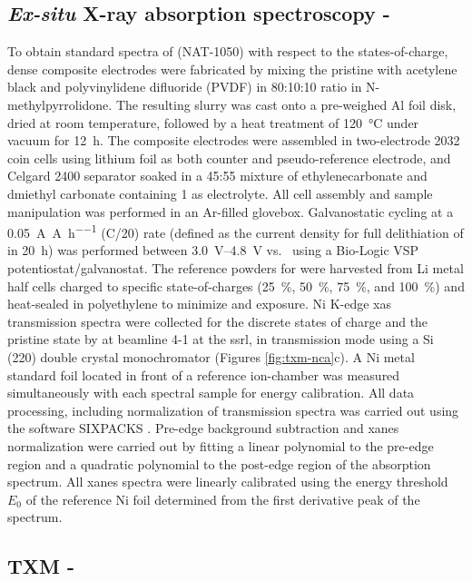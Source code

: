 \documentclass{article}
\begin{document}
\subsection*{\textit{Ex-situ} X-ray absorption spectroscopy - \nca{}}
To obtain standard spectra of \nca{} (NAT-1050) with respect to the
states-of-charge, dense composite electrodes were fabricated by mixing
the pristine \nca{} with acetylene black and polyvinylidene difluoride
(PVDF) in 80:10:10 ratio in N-methylpyrrolidone. The resulting slurry
was cast onto a pre-weighed Al foil disk, dried at room temperature,
followed by a heat treatment of \SI{120}{\celsius} under vacuum for
\SI{12}{\hour}. The composite electrodes were assembled in two-electrode 2032 coin
cells using lithium foil as both counter and pseudo-reference
electrode, and Celgard 2400 separator soaked in a 45:55 mixture of
ethylenecarbonate and dmiethyl carbonate containing \SI{1}{\molar}
 as electrolyte. All cell assembly and sample manipulation
was performed in an Ar-filled glovebox. Galvanostatic cycling at a
\SI{0.05}{\ampere\per\ampere\per\hour} (C/20) rate (defined as the
current density for full delithiation of \nca{} in \SI{20}{\hour}) was
performed between \SIrange{3.0}{4.8}{\volt} vs.\  using a
Bio-Logic VSP potentiostat/galvanostat. The reference powders for
\nca{} were harvested from Li metal half cells charged to specific
state-of-charges (\SI{25}{\percent}, \SI{50}{\percent},
\SI{75}{\percent}, and \SI{100}{\percent}) and heat-sealed in
polyethylene to minimize  and  exposure. Ni K-edge
\gls{xas} transmission spectra were collected for the discrete states
of charge and the pristine state by at beamline 4-1 at the \gls{ssrl},
in transmission mode using a Si (220) double crystal monochromator
(Figures \ref{fig:txm-nca}c). A Ni metal standard foil located in
front of a reference ion-chamber was measured simultaneously with each
spectral sample for energy calibration. All data processing, including
normalization of transmission spectra was carried out using the
software {SIXPACKS} \cite{lai2011}. Pre-edge background subtraction
and \gls{xanes} normalization were carried out by fitting a linear
polynomial to the pre-edge region and a quadratic polynomial to the
post-edge region of the absorption spectrum. All \gls{xanes} spectra
were linearly calibrated using the energy threshold $E_0$ of the
reference Ni foil determined from the first derivative peak of the
spectrum.


\subsection*{TXM - \nca{}}
\end{document}
